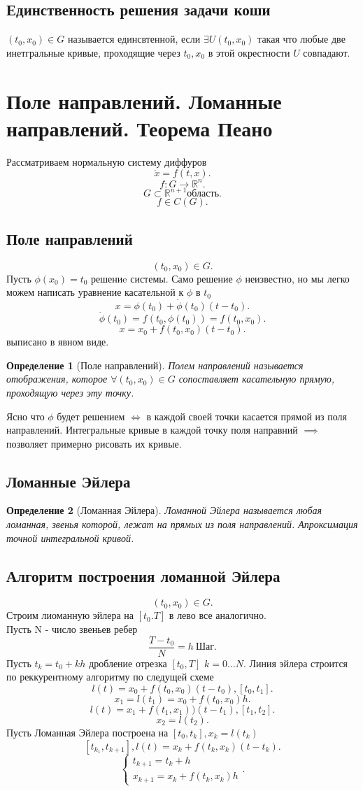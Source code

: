 \documentclass[14pt]{extarticle}
\newtheorem{definition}{Определение}
\begin{document}
\subsection{Единственность решения задачи коши}
$(t_0,x_0) \in G$ называется единсвтенной, если $\exists  U(t_0,x_0)$ такая что любые две инетгральные кривые, проходящие через $t_0,x_0$ в этой окрестности $U$ совпадают.
\section{Поле направлений. Ломанные направлений. Теорема Пеано}
Рассматриваем нормальную систему диффуров
\[
	\dot{x} = f(t,x)
	.\]
\[
	f: G \to \mathbb{R}^{n}
	.\]
\[
	G \subset \mathbb{R}^{n+1} \text{область}
	.\]
\[
	f \in C(G)
	.\]
\subsection{Поле направлений}
\[
	(t_0,x_0) \in G
	.\]
Пусть  $\phi(x_0) = t_0$ решениe системы. Само решение $\phi$ неизвестно, но
мы легко можем написать уравнение касательной к  $\phi$ в  $t_0$
\[
	x = \phi(t_0) + \dot{\phi}(t_0) (t - t_0)
	.\]
\[
	\dot{\phi}(t_0) = f(t_0,\phi(t_0)) = f(t_0,x_0)
	.\]
\[
	x = x_0 + f(t_0,x_0)(t -t_0)
	.\]
выписано в явном виде.
\begin{definition}[Поле направлений]
	Полем направлений называется отображения, которое $\forall  (t_0,x_0) \in G$ сопоставляет касательную прямую, проходящую через эту точку.
\end{definition}
Ясно что $\phi$ будет решением  $\iff$  в каждой своей точки касается прямой из поля направлений. Интегральные кривые в каждой точку поля направний  $\implies$ позволяет примерно рисовать их кривые.
\subsection{Ломанные Эйлера}
\begin{definition}[Ломанная Эйлера]
	Ломанной Эйлера называется любая ломанная, звенья которой, лежат на прямых из поля направлений. Апроксимация точной интегральной кривой.
\end{definition}
\subsection{Алгоритм построения ломанной Эйлера}
\[
	(t_0,x_0) \in G
	.\]
Строим лиоманную эйлера на $[t_0.T]$ в лево все аналогично.\\
Пусть N - число звеньев ребер
\[
	\frac{T - t_0}{N} = h ~\text{Шаг}
	.\]
Пусть $t_{k} = t_0 + kh$ дробление отрезка $[t_0,T]$ $k = 0\dots N$.
Линия эйлера строится по реккурентному алгоритму по следущей схеме
\[
	l(t) = x_0 + f(t_0,x_0)(t - t_0), [t_0,t_1]
	.\]
\[
	x_1 = l(t_1) = x_0 + f(t_0,x_0)h
	.\]
\[
	l(t) = x_1 + f(t_1,x_1))(t- t_1),  [t_1,t_2]
	.\]
\[
	x_2 = l(t_2)
	.\]
Пусть Ломанная Эйлера построена на $[t_0,t_{k}],x_{k} = l(t_{k})$
\[
	[t_{k_1} , t_{k + 1}] , l(t) = x_{k} + f(t_{k},x_{k}) (t - t_{k})
	.\]
\[
	\begin{cases}
		t_{k + 1} = t_{k}  + h \\
		x_{k + 1} = x_{k} + f(t_{k},x_k)h
	\end{cases}
	.\]
\end{document}

